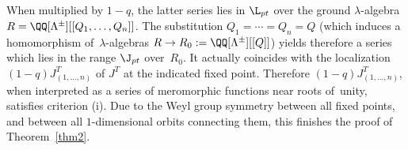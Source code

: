 When multiplied by $1-q$, the latter series lies in $\L_{pt}$ over the ground $\lambda$-algebra $R=\QQ[\Lambda^{\pm}][[Q_1,\dots,Q_n]]$. The substitution $Q_1=\cdots=Q_n=Q$ (which induces a homomorphism of~$\lambda$-algebras $R\to R_0:=\QQ[\Lambda^{\pm}][[Q]]$) yields therefore a series which lies in the range $\J_{pt}$ over~$R_0$. It actually coincides with the localization $(1-q) J^T_{(1,\dots,n)}$ of $J^T$ at the indicated fixed point. Therefore $(1-q) J^T_{(1,\dots,n)}$, when interpreted as a series of meromorphic functions near roots of~unity, satisfies criterion (i). Due to the Weyl group symmetry between all fixed points, and between all $1$-dimensional orbits connecting them, this finishes the proof of Theorem~\ref{thm2}.


